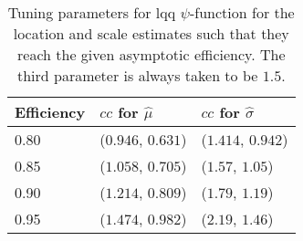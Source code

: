 \begin{table}[htbp!]
\begin{center}
{\small
\begin{tabular}{lll}
  \hline
Efficiency & $cc$ for $\hat\mu$ & $cc$ for $\hat\sigma$ \\ 
  \hline
0.80 & ($0.946$, $0.631$) & ($1.414$, $0.942$) \\ 
  0.85 & ($1.058$, $0.705$) & ($1.57$, $1.05$) \\ 
  0.90 & ($1.214$, $0.809$) & ($1.79$, $1.19$) \\ 
  0.95 & ($1.474$, $0.982$) & ($2.19$, $1.46$) \\ 
   \hline
\end{tabular}
}
\caption{Tuning parameters for lqq $\psi$-function for the location and scale estimates such that they reach the given asymptotic efficiency. The third parameter is always taken to be $1.5$.}
\label{tab:eqqLqqLocationScale}
\end{center}
\end{table}
